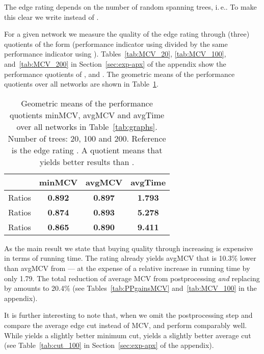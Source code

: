 \documentclass[pdftex]{llncs}
\newcommand{\ie}{i.\,e.\xspace}
\numberwithin{equation}{section}
\numberwithin{example}{section}
\numberwithin{table}{section}
\begin{document}
The edge rating  depends on the number of random spanning
trees, \ie . To make this clear we write
 instead of .

For a given network we measure the quality of the edge rating
 through (three) quotients of the
form (performance indicator using 
divided by the same performance indicator using
). Tables~\ref{tab:MCV_20}, \ref{tab:MCV_100},
and~\ref{tab:MCV_200} in Section~\ref{sec:exp-apx} of the appendix
show the performance quotients of ,  and
. The geometric means of the performance quotients over
all networks are shown in Table~\ref{tab:meansQuot}.

\begin{table}[tb]
  \caption{Geometric means of the performance quotients minMCV, avgMCV
    and avgTime over all networks in
    Table~\ref{tab:graphs}. Number of trees: 20, 100 and 200. Reference is the edge
    rating . A quotient  means that
     yields better results than .}
\begin{center}
\begin{tabular}{ l | c c | c }
                               & minMCV            & avgMCV              & avgTime\\\hline \hline                                 
Ratios  & \textbf{0.892}    & \textbf{0.897}      & \textbf{1.793}\\ \hline
Ratios  & \textbf{0.874}    & \textbf{0.893}      & \textbf{5.278}\\ \hline
Ratios  & \textbf{0.865}    & \textbf{0.890}      & \textbf{9.411}\\ \hline
\end{tabular}
\end{center}
\label{tab:meansQuot}
\vspace{-7mm} 
\end{table}

As the main result we state that buying quality through increasing
 is expensive in terms of running time. The
rating  already yields avgMCV that is 10.3\% lower than
avgMCV from  --- at the expense of a relative increase in
running time by only 1.79. The total reduction of average MCV from
postprocessing {\em and} replacing  by  amounts
to 20.4\% (see Tables~\ref{tab:PPgainsMCV} and~\ref{tab:MCV_100} in
the appendix).


It is further interesting to note that, when we omit the
postprocessing step and compare the average edge cut instead of MCV,
 and  perform comparably well. While  yields
a slightly better minimum cut,  yields a slightly better
average cut (see Table~\ref{tab:cut_100} in Section~\ref{sec:exp-apx}
of the appendix).
\end{document}
